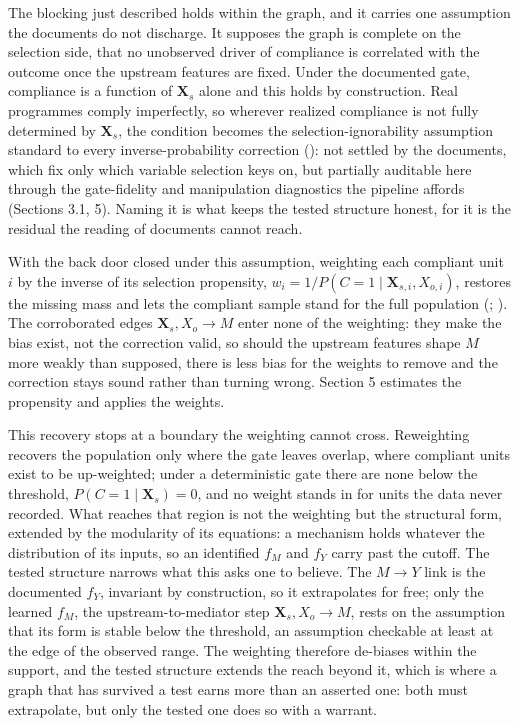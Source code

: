 The blocking just described holds within the graph, and it carries one assumption the documents do not discharge. It supposes the graph is complete on the selection side, that no unobserved driver of compliance is correlated with the outcome once the upstream features are fixed. Under the documented gate, compliance is a function of $\mathbf{X}_s$ alone and this holds by construction. Real programmes comply imperfectly, so wherever realized compliance is not fully determined by $\mathbf{X}_s$, the condition becomes the selection-ignorability assumption standard to every inverse-probability correction (): not settled by the documents, which fix only which variable selection keys on, but partially auditable here through the gate-fidelity and manipulation diagnostics the pipeline affords (Sections 3.1, 5). Naming it is what keeps the tested structure honest, for it is the residual the reading of documents cannot reach.

With the back door closed under this assumption, weighting each compliant unit $i$ by the inverse of its selection propensity, $w_i = 1 / P(C = 1 \mid \mathbf{X}_{s,i}, X_{o,i})$, restores the missing mass and lets the compliant sample stand for the full population (; ). The corroborated edges $\mathbf{X}_s, X_o \to M$ enter none of the weighting: they make the bias exist, not the correction valid, so should the upstream features shape $M$ more weakly than supposed, there is less bias for the weights to remove and the correction stays sound rather than turning wrong. Section 5 estimates the propensity and applies the weights.

This recovery stops at a boundary the weighting cannot cross. Reweighting recovers the population only where the gate leaves overlap, where compliant units exist to be up-weighted; under a deterministic gate there are none below the threshold, $P(C = 1 \mid \mathbf{X}_s) = 0$, and no weight stands in for units the data never recorded. What reaches that region is not the weighting but the structural form, extended by the modularity of its equations: a mechanism holds whatever the distribution of its inputs, so an identified $f_M$ and $f_Y$ carry past the cutoff. The tested structure narrows what this asks one to believe. The $M \to Y$ link is the documented $f_Y$, invariant by construction, so it extrapolates for free; only the learned $f_M$, the upstream-to-mediator step $\mathbf{X}_s, X_o \to M$, rests on the assumption that its form is stable below the threshold, an assumption checkable at least at the edge of the observed range. The weighting therefore de-biases within the support, and the tested structure extends the reach beyond it, which is where a graph that has survived a test earns more than an asserted one: both must extrapolate, but only the tested one does so with a warrant.


